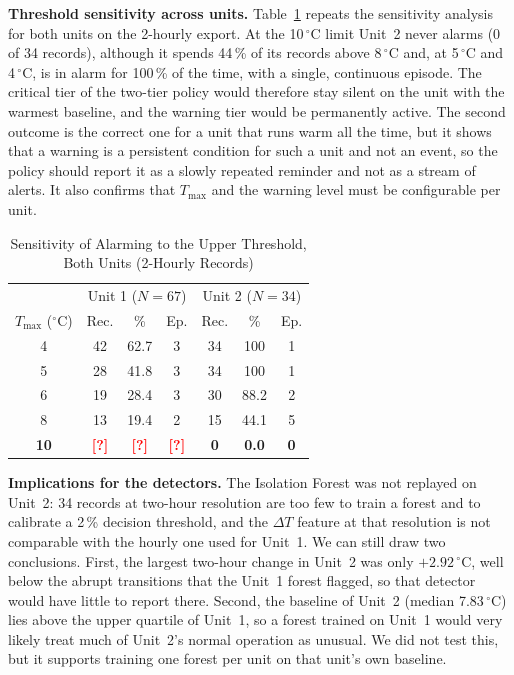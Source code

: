 \documentclass[conference]{IEEEtran}
\newcommand{\degC}{\ensuremath{^{\circ}}C}
\newcommand{\Tmax}{\ensuremath{T_{\max}}}
\newcommand{\tbd}{\textcolor{red}{\textbf{[?]}}}
\begin{document}
\textbf{Threshold sensitivity across units.} Table~\ref{tab:sens2} repeats the sensitivity analysis for both units on the 2-hourly export. At the 10\,\degC{} limit Unit~2 never alarms (0 of 34 records), although it spends 44\,\% of its records above 8\,\degC{} and, at 5\,\degC{} and 4\,\degC, is in alarm for 100\,\% of the time, with a single, continuous episode. The critical tier of the two-tier policy would therefore stay silent on the unit with the warmest baseline, and the warning tier would be permanently active. The second outcome is the correct one for a unit that runs warm all the time, but it shows that a warning is a persistent condition for such a unit and not an event, so the policy should report it as a slowly repeated reminder and not as a stream of alerts. It also confirms that \Tmax{} and the warning level must be configurable per unit.

\begin{table}[t]
\caption{Sensitivity of Alarming to the Upper Threshold, Both Units (2-Hourly Records)}
\label{tab:sens2}
\centering
\footnotesize
\setlength{\tabcolsep}{3pt}
\begin{tabular}{c|ccc|ccc}
\toprule
 & \multicolumn{3}{c|}{Unit 1 ($N=67$)} & \multicolumn{3}{c}{Unit 2 ($N=34$)} \\
\Tmax{} (\degC) & Rec. & \% & Ep. & Rec. & \% & Ep. \\
\midrule
4 & 42 & 62.7 & 3 & 34 & 100 & 1 \\
5 & 28 & 41.8 & 3 & 34 & 100 & 1 \\
6 & 19 & 28.4 & 3 & 30 & 88.2 & 2 \\
8 & 13 & 19.4 & 2 & 15 & 44.1 & 5 \\
\textbf{10} & \tbd & \tbd & \tbd & \textbf{0} & \textbf{0.0} & \textbf{0} \\
\bottomrule
\end{tabular}
\end{table}

\textbf{Implications for the detectors.} The Isolation Forest was not replayed on Unit~2: 34 records at two-hour resolution are too few to train a forest and to calibrate a 2\,\% decision threshold, and the $\Delta T$ feature at that resolution is not comparable with the hourly one used for Unit~1. We can still draw two conclusions. First, the largest two-hour change in Unit~2 was only $+2.92$\,\degC, well below the abrupt transitions that the Unit~1 forest flagged, so that detector would have little to report there. Second, the baseline of Unit~2 (median 7.83\,\degC) lies above the upper quartile of Unit~1, so a forest trained on Unit~1 would very likely treat much of Unit~2's normal operation as unusual. We did not test this, but it supports training one forest per unit on that unit's own baseline.
\end{document}
